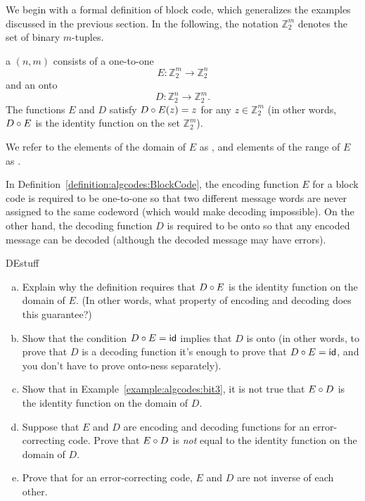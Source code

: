 We begin with a formal definition of block code, which generalizes the examples discussed in the previous section. In the following, the notation $\mathbb{Z}^{m}_{2}$ denotes the set of  binary $m$-tuples.

\begin{defn}\label{definition:algcodes:BlockCode}
a $(n, m)$    consists of a one-to-one  
\[
E:\mathbb{Z}^{m}_{2} \rightarrow \mathbb{Z}^{n}_{2}
\]
and an onto  
\[
D:\mathbb{Z}^{n}_{2} \rightarrow \mathbb{Z}^{m}_{2}.
\]
The functions $E$ and $D$ satisfy $D \circ E (z)= z$ for any $z \in \mathbb{Z}_2^m$ (in other words, $D \circ E$ is the identity function on the set $\mathbb{Z}_2^m$).

We refer to the elements of the domain of $E$ as , and elements of the range of $E$ as . 
\end{defn}

\begin{rem}
In Definition~\ref{definition:algcodes:BlockCode}, the encoding function $E$ for a block code is required to be one-to-one so that two different message words are never assigned to the same codeword (which would make decoding impossible). On the other hand, the decoding function $D$  is required to be onto so that any encoded message can be decoded (although the decoded message may have errors).
\end{rem}

\begin{exercise}{DEstuff}
\begin{enumerate}[(a)]
\item
Explain why the definition requires that $D \circ E$ is the identity function on the domain of $E$. (In other words, what property of encoding and decoding does this guarantee?)
\item
Show that the condition $D \circ E = \sf{id}$ implies that $D$ is onto  (in other words, to prove that $D$ is a decoding function it's enough to prove that $D \circ E = \sf{id}$, and you don't have to prove onto-ness separately).
\item
Show that in Example~\ref{example:algcodes:bit3}, it is not true that $E \circ D$ is the identity function on the domain of $D$.
\item
Suppose that  $E$ and $D$ are  encoding and decoding functions for an error-correcting code. Prove that $E \circ D$ is \emph{not} equal to the identity function on the domain of $D$.
\item
Prove that for an error-correcting code, $E$ and $D$ are not inverse of each other. 
\end{enumerate}
\end{exercise}

